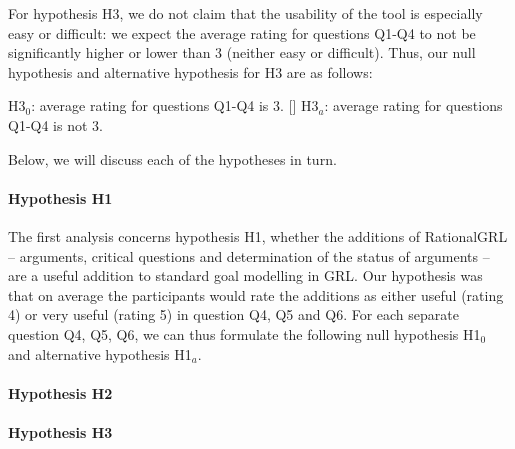 {For hypothesis H3, we do not claim that the usability of the tool is especially easy or difficult: we expect the average rating for questions Q1-Q4 to not be significantly higher or lower than 3 (neither easy or difficult). Thus, our null hypothesis and alternative hypothesis for H3 are as follows:  
\begin{itemize}
[] H3$_{0}$: average rating for questions Q1-Q4 is 3.
[] H3$_{a}$: average rating for questions Q1-Q4 is not 3.
\end{itemize}

Below, we will discuss each of the hypotheses in turn.

\paragraph{Hypothesis H1}
The first analysis concerns hypothesis H1, whether the additions of RationalGRL -- arguments, critical questions and determination of the status of arguments -- are a useful addition to standard goal modelling in GRL. Our hypothesis was that on average the participants would rate the additions as either useful (rating 4) or very useful (rating 5) in question Q4, Q5 and Q6. For each separate question Q4, Q5, Q6, we can thus formulate the following null hypothesis H1$_{0}$ and alternative hypothesis H1$_{a}$.  

\paragraph{Hypothesis H2}

\paragraph{Hypothesis H3}




}
